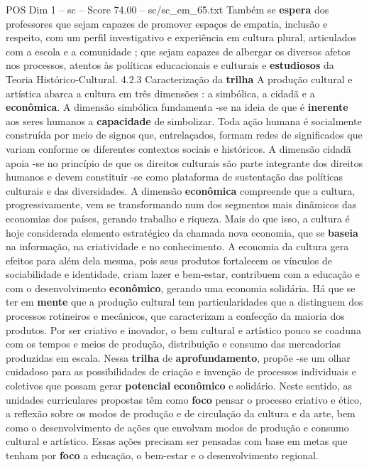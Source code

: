 \begin{textsample}{POS Dim 1 – sc – Score 74.00 – sc/sc\_em\_65.txt}
Também se \textbf{espera} dos professores que sejam capazes de promover espaços de empatia, inclusão e respeito, com um perfil investigativo e experiência em cultura plural, articulados com a escola e a comunidade ; que sejam capazes de albergar os diversos afetos nos processos, atentos às políticas educacionais e culturais e \textbf{estudiosos} da Teoria Histórico-Cultural. 4.2.3 Caracterização da \textbf{trilha} A produção cultural e artística abarca a cultura em três dimensões : a simbólica, a cidadã e a \textbf{econômica}.
A dimensão simbólica fundamenta -se na ideia de que é \textbf{inerente} aos seres humanos a \textbf{capacidade} de simbolizar.
Toda ação humana é socialmente construída por meio de signos que, entrelaçados, formam redes de significados que variam conforme os diferentes contextos sociais e históricos.
A dimensão cidadã apoia -se no princípio de que os direitos culturais são parte integrante dos direitos humanos e devem constituir -se como plataforma de sustentação das políticas culturais e das diversidades.
A dimensão \textbf{econômica} compreende que a cultura, progressivamente, vem se transformando num dos segmentos mais dinâmicos das economias dos países, gerando trabalho e riqueza.
Mais do que isso, a cultura é hoje considerada elemento estratégico da chamada nova economia, que se \textbf{baseia} na informação, na criatividade e no conhecimento.
A economia da cultura gera efeitos para além dela mesma, pois seus produtos fortalecem os vínculos de sociabilidade e identidade, criam lazer e bem-estar, contribuem com a educação e com o desenvolvimento \textbf{econômico}, gerando uma economia solidária.
Há que se ter em \textbf{mente} que a produção cultural tem particularidades que a distinguem dos processos rotineiros e mecânicos, que caracterizam a confecção da maioria dos produtos.
Por ser criativo e inovador, o bem cultural e artístico pouco se coaduna com os tempos e meios de produção, distribuição e consumo das mercadorias produzidas em escala.
Nessa \textbf{trilha} de \textbf{aprofundamento}, propõe -se um olhar cuidadoso para as possibilidades de criação e invenção de processos individuais e coletivos que possam gerar \textbf{potencial} \textbf{econômico} e solidário.
Neste sentido, as unidades curriculares propostas têm como \textbf{foco} pensar o processo criativo e ético, a reflexão sobre os modos de produção e de circulação da cultura e da arte, bem como o desenvolvimento de ações que envolvam modos de produção e consumo cultural e artístico.
Essas ações precisam ser pensadas com base em metas que tenham por \textbf{foco} a educação, o bem-estar e o desenvolvimento regional.

\end{textsample}
